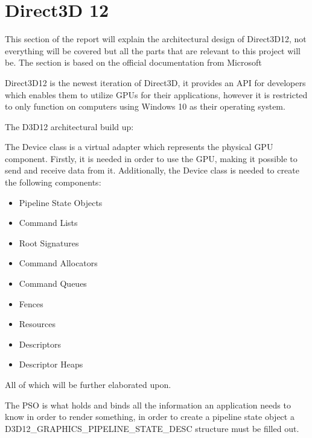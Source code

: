 \section{Direct3D 12}\label{sec:direct3d_12}
This section of the report will explain the architectural design of Direct3D12, not everything will be covered but all the parts that are relevant to this project will be. The section is based on the official documentation from Microsoft \cite{D3D12MicrosoftDocumentation}


Direct3D12 is the newest iteration of Direct3D, it provides an API for developers which enables them to utilize \glspl{GPU} for their applications, however it is restricted to only function on computers using Windows 10 as their operating system.


The D3D12 architectural build up:


The Device class is a virtual adapter which represents the physical GPU component. 
Firstly, it is needed in order to use the \gls{GPU}, making it possible to send and receive data from it.
Additionally, the Device class is needed to create the following components: 
\begin{itemize}
\item Pipeline State Objects
\item Command Lists
\item Root Signatures 
\item Command Allocators 
\item Command Queues 
\item Fences 
\item Resources 
\item Descriptors 
\item Descriptor Heaps
\end{itemize}

All of which will be further elaborated upon. 

The \gls{PSO} is what holds and binds all the information an application needs to know in order to render something, in order to create a pipeline state object a D3D12\_GRAPHICS\_PIPELINE\_STATE\_DESC structure must be filled out.



